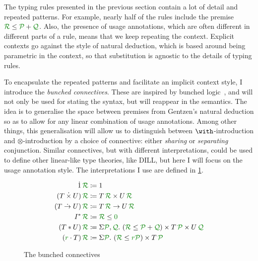 
The typing rules presented in the previous section contain a lot of detail and
repeated patterns.
For example, nearly half of the rules include the premise
$\grR \leq \grP + \grQ$.
Also, the presence of usage annotations, which are often different in different
parts of a rule, means that we keep repeating the context.
Explicit contexts go against the style of natural deduction, which is based
around being parametric in the context, so that substitution is agnostic to the
details of typing rules.

To encapsulate the repeated patterns and facilitate an implicit context style,
I introduce the \emph{bunched connectives}.
These are inspired by bunched logic~\cite{oHP99}, and will not only be used for
stating the syntax, but will reappear in the semantics.
The idea is to generalise the space between premises from Gentzen's natural
deduction so as to allow for any linear combination of usage annotations.
Among other things, this generalisation will allow us to distinguish between
$\with$-introduction and $\otimes$-introduction by a choice of connective:
either \emph{sharing} or \emph{separating} conjunction.
Similar connectives, but with different interpretations, could be used to
define other linear-like type theories, like DILL, but here I will focus on the
usage annotation style.
The interpretations I use are defined in \cref{fig:bunched}.

\begin{figure}
  \begin{align*}
    \dot1\,\grR &\coloneqq 1 \\
    (T \dottimes U)\,\grR &\coloneqq T\,\grR \times U\,\grR \\
    (T \dotto U)\,\grR &\coloneqq T\,\grR \to U\,\grR \\
    I^*\,\grR &\coloneqq \grR \leq \gr0 \\
    (T \sep U)\,\grR &\coloneqq \Sigma \grP,\grQ.~\plr{\grR \leq \grP + \grQ}
                       \times T\,\grP \times U\,\grQ \\
    (\gr r \cdot T)\,\grR &\coloneqq \Sigma \grP.~\plr{\grR \leq \gr r\grP}
                       \times T\,\grP
  \end{align*}
  \caption{The bunched connectives}
  \label{fig:bunched}
\end{figure}

